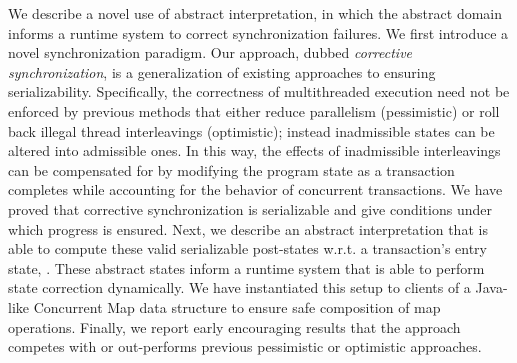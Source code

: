 We describe a novel use of abstract interpretation, in which the
abstract domain informs a runtime system to correct synchronization
failures. We first introduce a novel synchronization paradigm. Our
approach, dubbed \emph{corrective synchronization},
is a generalization of existing approaches to ensuring serializability.
%
Specifically, the correctness of multithreaded execution need not be
enforced by previous methods that either reduce parallelism
(pessimistic) or roll back illegal thread interleavings (optimistic);
instead inadmissible states can be altered into admissible ones.
%
In this way, the effects of inadmissible interleavings can be
compensated for by modifying the program state as a transaction
completes while accounting for the behavior of concurrent
transactions.
%
We have proved that corrective
synchronization is serializable and give conditions under which
progress is ensured. Next, we describe an abstract
interpretation that is able to compute these valid serializable
post-states w.r.t. a transaction's entry state, .
%
These abstract states
inform a runtime system that is able to perform state correction
dynamically. We have instantiated this setup to clients of a Java-like
Concurrent Map data structure to ensure safe composition of map
operations. Finally, we report early encouraging results that the
approach competes with or out-performs previous pessimistic or
optimistic approaches.




